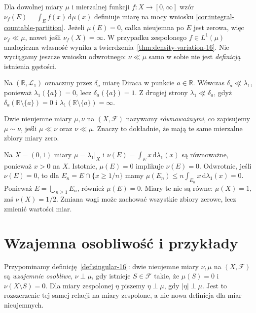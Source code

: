 \begin{przyklad}
\label{ex:ac-density-17}
Dla dowolnej miary $\mu$ i mierzalnej funkcji $f:X\to[0,\infty]$
wzór $\nu_f(E)=\int_E f(x)\,\mathrm d\mu(x)$ definiuje miarę
na mocy wniosku \ref{cor:integral-countable-partition}.
Jeżeli $\mu(E)=0$, całka nieujemna po $E$ jest zerowa,
więc $\nu_f\ll\mu$, nawet jeśli $\nu_f(X)=\infty$.
W przypadku zespolonego $f\in L^1(\mu)$ analogiczna własność
wynika z twierdzenia~\ref{thm:density-variation-16}.
Nie wyciągamy jeszcze wniosku odwrotnego: $\nu\ll\mu$
samo w sobie nie jest \emph{definicją} istnienia gęstości.
\end{przyklad}

\begin{przyklad}
Na $(\mathbb R,\mathcal L_1)$ oznaczmy przez $\delta_a$ miarę Diraca
w punkcie $a\in\mathbb R$. Wówczas $\delta_a\not\ll\lambda_1$,
ponieważ $\lambda_1(\{a\})=0$, lecz $\delta_a(\{a\})=1$.
Z drugiej strony $\lambda_1\not\ll\delta_a$, gdyż
$\delta_a(\mathbb R\setminus\{a\})=0$ i
$\lambda_1(\mathbb R\setminus\{a\})=\infty$.
\end{przyklad}

\begin{definicja}
\label{def:equivalent-measures-17}
Dwie nieujemne miary $\mu,\nu$ na $(X,\mathcal F)$ nazywamy
\emph{równoważnymi}, co zapisujemy $\mu\sim\nu$,
jeśli $\mu\ll\nu$ oraz $\nu\ll\mu$.
Znaczy to dokładnie, że mają te same mierzalne zbiory miary zero.
\end{definicja}

\begin{przyklad}
Na $X=(0,1)$ miary $\mu=\lambda_1|_X$ i
$\nu(E)=\int_E x\,\mathrm d\lambda_1(x)$ są równoważne,
ponieważ $x>0$ na $X$. Istotnie, $\mu(E)=0$
implikuje $\nu(E)=0$. Odwrotnie, jeśli $\nu(E)=0$,
to dla $E_n=E\cap\{x\ge1/n\}$ mamy
$\mu(E_n)\le n\int_{E_n}x\,\mathrm d\lambda_1(x)=0$.
Ponieważ $E=\bigcup_{n\ge1}E_n$, również $\mu(E)=0$.
Miary te nie są równe: $\mu(X)=1$, zaś $\nu(X)=1/2$.
Zmiana wagi może zachować wszystkie zbiory zerowe,
lecz zmienić wartości miar.
\end{przyklad}

\section{Wzajemna osobliwość i przykłady}
Przypominamy definicję~\ref{def:singular-16}:
dwie nieujemne miary $\nu,\mu$ na $(X,\mathcal F)$ są
\emph{wzajemnie osobliwe}, $\nu\perp\mu$, gdy istnieje
$S\in\mathcal F$ takie, że $\mu(S)=0$ i
$\nu(X\setminus S)=0$. Dla miary zespolonej $\eta$
piszemy $\eta\perp\mu$, gdy $|\eta|\perp\mu$.
Jest to rozszerzenie tej samej relacji na miary zespolone,
a nie nowa definicja dla miar nieujemnych.

